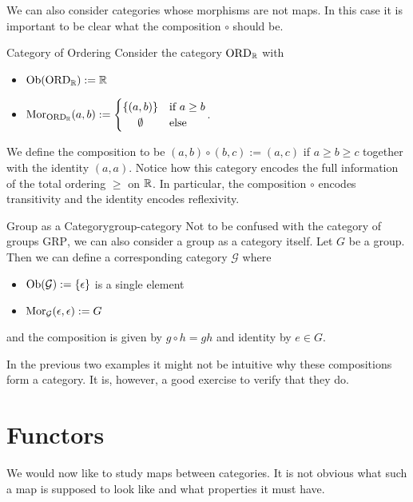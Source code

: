 We can also consider categories whose morphisms are not maps. In this case it is important to be clear what the composition $\circ$ should be.

\begin{example}{Category of Ordering}{}
Consider the category $\mathrm{ORD}_\mathbb R$ with
\begin{itemize}
    \item $\mathrm {Ob}(\mathrm{ORD}_\mathbb R) := \mathbb R$
    \item $\mor_{\mathrm{ORD}_\R}(a,b) := \begin{cases}
        \{(a,b)\} & \text{if $a \ge b$} \\
        \hfil \emptyset & \text{else}
    \end{cases}$.
\end{itemize}
We define the composition to be $(a,b) \circ (b,c) := (a,c)$ if $a \ge b \ge c$ together with the identity $(a,a)$.
Notice how this category encodes the full information of the total ordering $\ge$ on $\mathbb R$. In particular, the composition $\circ$ encodes transitivity and the identity encodes reflexivity.
\end{example}

\begin{example}{Group as a Category}{group-category}
Not to be confused with the category of groups $\mathrm{GRP}$, we can also consider a group as a category itself.
Let $G$ be a group. Then we can define a corresponding category $\mathcal{G}$ where
\begin{itemize}
    \item $\mathrm {Ob}(\mathcal{G}) := \{\epsilon\}$ is a single element
    \item $\mathrm {Mor}_{\mathcal{G}}(\epsilon,\epsilon) := G$
\end{itemize}
and the composition is given by $g \circ h = gh$ and identity by $e \in G$.
\end{example}
In the previous two examples it might not be intuitive why these compositions form a category. It is, however, a good exercise to verify that they do.

\section{Functors}
We would now like to study maps between categories. 
It is not obvious what such a map is supposed to look like and what properties it must have.

